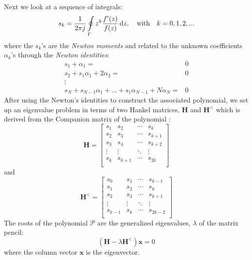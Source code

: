 \documentclass[12pt]{article}
\begin{document}
Next we look at a sequence of integrals:
%
\begin{equation}
  s_k = \frac{1}{2 \pi j} \oint \limits_{\Gamma} z^k \frac{f'(z)}{f(z)} \dif z, \quad \mathrm{with}\quad k = 0,1,2,...
  \label{eq:sk}
\end{equation}
%
where the $s_k$'s are the \emph{Newton moments} and related to the unknown coefficients $\alpha_k$'s through the \emph{Newton identities}:
%
\begin{equation}
  \begin{aligned}
    s_1 + \alpha_1 ={}& 0 \\
    s_2 + s_1 \alpha_1 + 2 \alpha_2 ={}& 0 \\
    {\vdots}\\
    s_N + s_{N-1} \alpha_{1} + ... + s_1 \alpha_{N-1} + N \alpha_N ={}& 0
    \label{eq:newtid}
  \end{aligned}
\end{equation}
%
After using the Newton's identities to construct the associated polynomial, we set up an eigenvalue problem in terms of two Hankel matrices, $\mathbf H$ and $\mathbf H^<$ which is derived from the Companion matrix of the polynomial \cite{Gillan2006c}:
%
\begin{equation}
  \mathbf H =
  \begin{bmatrix}
    s_1 & s_2 & \cdots & s_k \\
    s_2 & s_3 & \cdots & s_{k+1} \\
    s_3 & s_4 & \cdots & s_{k+2} \\
    \vdots & \vdots & \ddots & \vdots \\
    s_k & s_{k+1} & \cdots & s_{2k} \\
  \end{bmatrix}
  \label{eq:Hmat}
\end{equation}
%
and
%
\begin{equation}
  \mathbf H^< =
  \begin{bmatrix}
    s_0 & s_1 & \cdots & s_{k-1} \\
    s_1 & s_2 & \cdots & s_{k} \\
    s_2 & s_3 & \cdots & s_{k+1} \\
    \vdots & \vdots & \ddots & \vdots \\
    s_{k-1} & s_{k} & \cdots & s_{2k-2} \\
  \end{bmatrix}
  \label{eq:Hmat<}
\end{equation}
%
The roots of the polynomial $\mathcal P$ are the generalized eigenvalues, $\lambda$ of the matrix pencil:
%
\begin{equation}
  \left( \mathbf H - \lambda \mathbf H^< \right) \mathbf x = 0
  \label{eq:evp}
\end{equation}
%
where the column vector $\mathbf{x}$ is the eigenvector.
%
\end{document}
